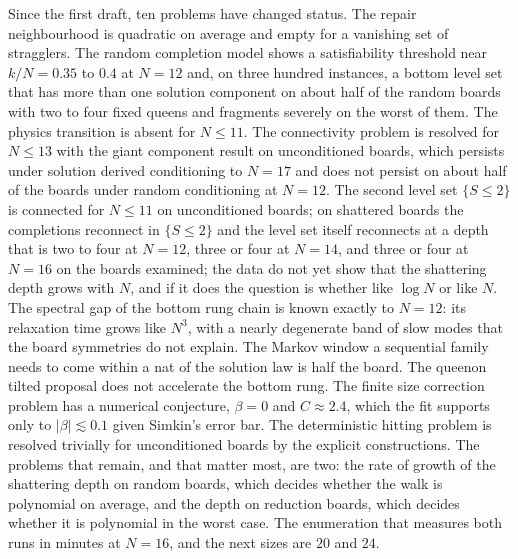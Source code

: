 Since the first draft, ten problems have changed status. The repair neighbourhood is quadratic on average and empty for a vanishing set of stragglers. The random completion model shows a satisfiability threshold near $k/N = 0.35$ to $0.4$ at $N = 12$ and, on three hundred instances, a bottom level set that has more than one solution component on about half of the random boards with two to four fixed queens and fragments severely on the worst of them. The physics transition is absent for $N \le 11$. The connectivity problem is resolved for $N \le 13$ with the giant component result on unconditioned boards, which persists under solution derived conditioning to $N = 17$ and does not persist on about half of the boards under random conditioning at $N = 12$. The second level set $\{ S \le 2 \}$ is connected for $N \le 11$ on unconditioned boards; on shattered boards the completions reconnect in $\{ S \le 2 \}$ and the level set itself reconnects at a depth that is two to four at $N = 12$, three or four at $N = 14$, and three or four at $N = 16$ on the boards examined; the data do not yet show that the shattering depth grows with $N$, and if it does the question is whether like $\log N$ or like $N$. The spectral gap of the bottom rung chain is known exactly to $N = 12$: its relaxation time grows like $N^3$, with a nearly degenerate band of slow modes that the board symmetries do not explain. The Markov window a sequential family needs to come within a nat of the solution law is half the board. The queenon tilted proposal does not accelerate the bottom rung. The finite size correction problem has a numerical conjecture, $\beta = 0$ and $C \approx 2.4$, which the fit supports only to $|\beta| \lesssim 0.1$ given Simkin's error bar. The deterministic hitting problem is resolved trivially for unconditioned boards by the explicit constructions. The problems that remain, and that matter most, are two: the rate of growth of the shattering depth on random boards, which decides whether the walk is polynomial on average, and the depth on reduction boards, which decides whether it is polynomial in the worst case. The enumeration that measures both runs in minutes at $N = 16$, and the next sizes are $20$ and $24$.
